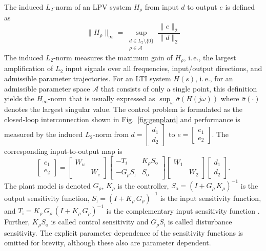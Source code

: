 \documentclass[times]{weauth}
\newcommand{\ba}{\left [ \begin{array}}
\newcommand{\ea}{\end{array} \right ]}
\begin{document}
The induced $L_2$-norm of an LPV system $H_\rho$ from input $d$ to output $e$ is defined as
\begin{equation}
	\|H_\rho\|_\infty =  \sup_{
	\begin{smallmatrix}
	d \in L_2 \setminus \{0\} \\ \rho\in\mathcal{A} 
	\end{smallmatrix}
	}
	\frac{\|e\|_2}{\|d\|_2}
\end{equation}
The induced $L_2$-norm measures the maximum gain of $H_\rho$, i.\,e., the largest
amplification of $L_2$ input signals over all frequencies, input/output directions, and admissible parameter trajectories. 
For an LTI system $H(s)$, i.\,e., for an admissible parameter space $\mathcal{A}$ that consists of only a single point, this definition yields the $H_\infty$-norm that is usually expressed as $\sup_\omega \bar{\sigma}(H(j \omega))$ where $\bar{\sigma}(\cdot)$ denotes the largest singular value.
The control problem is formulated as the closed-loop
interconnection shown in Fig.~\ref{fig:genplant} and performance is measured
by the induced $L_2$-norm from $d=[\begin{smallmatrix} d_1 \\ d_2 \end{smallmatrix}]$ to $e=[\begin{smallmatrix} e_1 \\ e_2 \end{smallmatrix}]$. 
The corresponding input-to-output map is
\begin{equation}\label{eq:genp}
	\ba{cc}  e_1 \\  e_2 \ea =
	\ba{cc} W_u &   \\    & W_e   \ea
	\ba{cc} -T_i &  K_\rho S_{\text{o}} \\ -G_\rho S_{\text{i}}   & S_{\text{o}}   \ea
	\ba{cc} W_1 &   \\    & W_2   \ea
	\ba{cc}  d_1  \\ d_2 \ea.
\end{equation}
The plant model is denoted $G_\rho$, $K_\rho$ is the controller, $S_\text{o} =
(I+G_\rho\,K_\rho)^{-1}$ is the output sensitivity function, $S_{\text{i}} = (I+K_\rho\,G_\rho)^{-1}$  is the input sensitivity function, and $T_{\text{i}} = K_\rho\,G_\rho\,
(I+K_\rho\,G_\rho)^{-1}$ is the complementary input sensitivity function \cite{Skoge_05}. 
Further, $K_\rho S_\text{o}$ is called control sensitivity and $G_\rho S_\text{i}$ is called disturbance sensitivity. The explicit parameter dependence of the sensitivity functions is omitted for brevity, although these also are parameter dependent.
\end{document}
